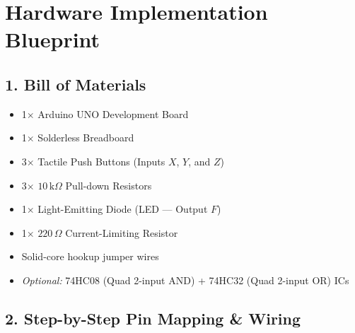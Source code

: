 \documentclass[12pt, a4paper]{article}
\begin{document}
\newpage
\section*{Hardware Implementation Blueprint}

\subsection*{1. Bill of Materials}
\begin{itemize}
  \item 1$\times$ Arduino UNO Development Board
  \item 1$\times$ Solderless Breadboard
  \item 3$\times$ Tactile Push Buttons (Inputs $X$, $Y$, and $Z$)
  \item 3$\times$ $10\,\text{k}\Omega$ Pull-down Resistors
  \item 1$\times$ Light-Emitting Diode (LED — Output $F$)
  \item 1$\times$ $220\,\Omega$ Current-Limiting Resistor
  \item Solid-core hookup jumper wires
  \item \textit{Optional:} 74HC08 (Quad 2-input AND) + 74HC32 (Quad 2-input OR) ICs
\end{itemize}

\subsection*{2. Step-by-Step Pin Mapping \& Wiring}
\end{document}
